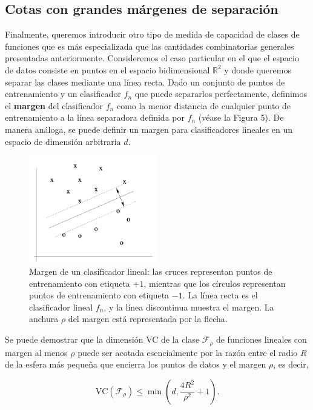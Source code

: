 \documentclass{article}
\begin{document}
\subsection{Cotas con grandes márgenes de separación}

Finalmente, queremos introducir otro tipo de medida de capacidad de clases de funciones que es 
más especializada que las cantidades combinatorias generales presentadas anteriormente. Consideremos 
el caso particular en el que el espacio de datos consiste en puntos en el espacio bidimensional 
\(\mathbb{R}^2\) y donde queremos separar las clases mediante una línea recta. Dado un conjunto 
de puntos de entrenamiento y un clasificador \(f_n\) que puede separarlos perfectamente, definimos 
el \textbf{margen} del clasificador \(f_n\) como la menor distancia de cualquier punto de entrenamiento 
a la línea separadora definida por \(f_n\) (véase la Figura 5). De manera análoga, se puede definir 
un margen para clasificadores lineales en un espacio de dimensión arbitraria \(d\).

\begin{figure}[h!]
    \centering
    \includegraphics[width=0.5\textwidth]{Images/6.png}
    \caption{Margen de un clasificador lineal: las cruces representan puntos de entrenamiento con 
    etiqueta \(+1\), mientras que los círculos representan puntos de entrenamiento con etiqueta \(-1\). 
    La línea recta es el clasificador lineal \(f_n\), y la línea discontinua muestra el margen. La 
    anchura \(\rho\) del margen está representada por la flecha.}
    \label{fig:Clasificación con margen}
\end{figure}

Se puede demostrar que la dimensión VC de la clase \(\mathcal{F}_\rho\) de funciones lineales con 
margen al menos \(\rho\) puede ser acotada esencialmente por la razón entre el radio \(R\) de la 
esfera más pequeña que encierra los puntos de datos y el margen \(\rho\), es decir,

\[
\text{VC}(\mathcal{F}_\rho) \leq \min \left(d, \frac{4R^2}{\rho^2} + 1 \right).
\]
\end{document}
